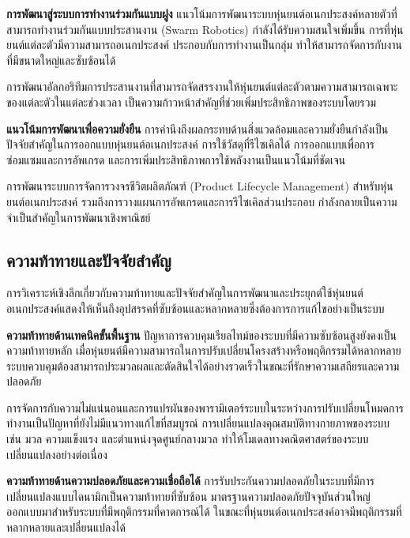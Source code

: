 \documentclass[a4paper]{article}
\begin{document}
\textbf{การพัฒนาสู่ระบบการทำงานร่วมกันแบบฝูง} แนวโน้มการพัฒนาระบบหุ่นยนต์อเนกประสงค์หลายตัวที่สามารถทำงานร่วมกันแบบประสานงาน (Swarm Robotics) กำลังได้รับความสนใจเพิ่มขึ้น \parencite{ieee2015prioritized} การที่หุ่นยนต์แต่ละตัวมีความสามารถอเนกประสงค์ ประกอบกับการทำงานเป็นกลุ่ม ทำให้สามารถจัดการกับงานที่มีขนาดใหญ่และซับซ้อนได้

การพัฒนาอัลกอริทึมการประสานงานที่สามารถจัดสรรงานให้หุ่นยนต์แต่ละตัวตามความสามารถเฉพาะของแต่ละตัวในแต่ละช่วงเวลา เป็นความก้าวหน้าสำคัญที่ช่วยเพิ่มประสิทธิภาพของระบบโดยรวม

\textbf{แนวโน้มการพัฒนาเพื่อความยั่งยืน} การคำนึงถึงผลกระทบด้านสิ่งแวดล้อมและความยั่งยืนกำลังเป็นปัจจัยสำคัญในการออกแบบหุ่นยนต์อเนกประสงค์ \parencite{li2025finite} การใช้วัสดุที่รีไซเคิลได้ การออกแบบเพื่อการซ่อมแซมและการอัพเกรด และการเพิ่มประสิทธิภาพการใช้พลังงานเป็นแนวโน้มที่ชัดเจน

การพัฒนาระบบการจัดการวงจรชีวิตผลิตภัณฑ์ (Product Lifecycle Management) สำหรับหุ่นยนต์อเนกประสงค์ รวมถึงการวางแผนการอัพเกรดและการรีไซเคิลส่วนประกอบ กำลังกลายเป็นความจำเป็นสำคัญในการพัฒนาเชิงพาณิชย์

\subsection{ความท้าทายและปัจจัยสำคัญ}

การวิเคราะห์เชิงลึกเกี่ยวกับความท้าทายและปัจจัยสำคัญในการพัฒนาและประยุกต์ใช้หุ่นยนต์อเนกประสงค์แสดงให้เห็นถึงอุปสรรคที่ซับซ้อนและหลากหลายซึ่งต้องการการแก้ไขอย่างเป็นระบบ

\textbf{ความท้าทายด้านเทคนิคขั้นพื้นฐาน} ปัญหาการควบคุมเรียลไทม์ของระบบที่มีความซับซ้อนสูงยังคงเป็นความท้าทายหลัก \parencite{thuruthel2021survey} เมื่อหุ่นยนต์มีความสามารถในการปรับเปลี่ยนโครงสร้างหรือพฤติกรรมได้หลากหลาย ระบบควบคุมต้องสามารถประมวลผลและตัดสินใจได้อย่างรวดเร็วในขณะที่รักษาความเสถียรและความปลอดภัย

การจัดการกับความไม่แน่นอนและการแปรผันของพารามิเตอร์ระบบในระหว่างการปรับเปลี่ยนโหมดการทำงานเป็นปัญหาที่ยังไม่มีแนวทางแก้ไขที่สมบูรณ์ การเปลี่ยนแปลงคุณสมบัติทางกายภาพของระบบ เช่น มวล ความแข็งแรง และตำแหน่งจุดศูนย์กลางมวล ทำให้โมเดลทางคณิตศาสตร์ของระบบเปลี่ยนแปลงอย่างต่อเนื่อง

\textbf{ความท้าทายด้านความปลอดภัยและความเชื่อถือได้} การรับประกันความปลอดภัยในระบบที่มีการเปลี่ยนแปลงแบบไดนามิกเป็นความท้าทายที่ซับซ้อน \parencite{iso2025robotics} มาตรฐานความปลอดภัยปัจจุบันส่วนใหญ่ออกแบบมาสำหรับระบบที่มีพฤติกรรมที่คาดการณ์ได้ ในขณะที่หุ่นยนต์อเนกประสงค์อาจมีพฤติกรรมที่หลากหลายและเปลี่ยนแปลงได้
\end{document}
